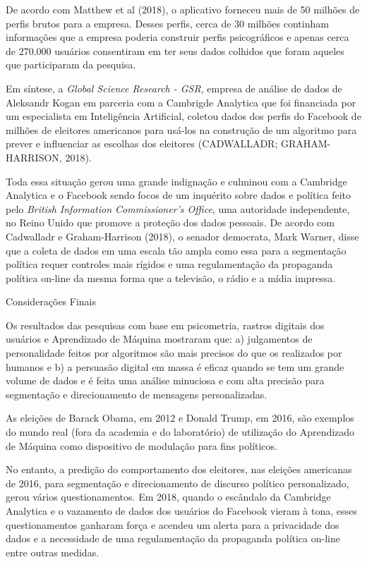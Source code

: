 De acordo com Matthew et al (2018), o aplicativo forneceu mais de 50
milhões de perfis brutos para a empresa. Desses perfis, cerca de 30
milhões continham informações que a empresa poderia construir perfis
psicográficos e apenas cerca de 270.000 usuários consentiram em ter seus
dados colhidos que foram aqueles que participaram da pesquisa.

Em síntese, a \emph{Global Science Research - GSR}, empresa de análise
de dados de Aleksandr Kogan em parceria com a Cambrigde Analytica que
foi financiada por um especialista em Inteligência Artificial, coletou
dados dos perfis do Facebook de milhões de eleitores americanos para
usá-los na construção de um algoritmo para prever e influenciar as
escolhas dos eleitores (CADWALLADR; GRAHAM-HARRISON, 2018).

Toda essa situação gerou uma grande indignação e culminou com a
Cambridge Analytica e o Facebook sendo focos de um inquérito sobre dados
e política feito pelo \emph{British Information Commissioner's Office},
uma autoridade independente, no Reino Unido que promove a proteção dos
dados pessoais\emph{.} De acordo com Cadwalladr e Graham-Harrison
(2018), o senador democrata, Mark Warner, disse que a coleta de dados em
uma escala tão ampla como essa para a segmentação política requer
controles mais rígidos e uma regulamentação da propaganda política
on-line da mesma forma que a televisão, o rádio e a mídia impressa.

\protect\hypertarget{_Toc520800102}{}{}Considerações Finais

Os resultados das pesquisas com base em psicometria, rastros digitais
dos usuários e Aprendizado de Máquina mostraram que: a) julgamentos de
personalidade feitos por algoritmos são mais precisos do que os
realizados por humanos e b) a persuasão digital em massa é eficaz quando
se tem um grande volume de dados e é feita uma análise minuciosa e com
alta precisão para segmentação e direcionamento de mensagens
personalizadas.

As eleições de Barack Obama, em 2012 e Donald Trump, em 2016, são
exemplos do mundo real (fora da academia e do laboratório) de utilização
do Aprendizado de Máquina como dispositivo de modulação para fins
políticos.

No entanto, a predição do comportamento dos eleitores, nas eleições
americanas de 2016, para segmentação e direcionamento de discurso
político personalizado, gerou vários questionamentos. Em 2018, quando o
escândalo da Cambridge Analytica e o vazamento de dados dos usuários do
Facebook vieram à tona, esses questionamentos ganharam força e acendeu
um alerta para a privacidade dos dados e a necessidade de uma
regulamentação da propaganda política on-line entre outras medidas.

